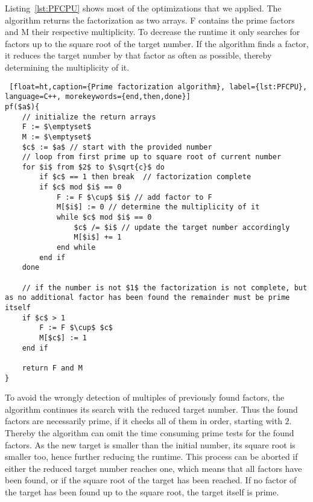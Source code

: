 Listing~\ref{lst:PFCPU} shows most of the optimizations that we applied. The algorithm returns the factorization as two arrays. F contains the prime factors and M their respective multiplicity. To decrease the runtime it only searches for factors up to the square root of the target number. If the algorithm finds a factor, it reduces the target number by that factor as often as possible, thereby determining the multiplicity of it.

\begin{lstlisting} [float=ht,caption={Prime factorization algorithm}, label={lst:PFCPU}, language=C++, morekeywords={end,then,done}]
pf($a$){
	// initialize the return arrays
	F := $\emptyset$
	M := $\emptyset$
	$c$ := $a$ // start with the provided number
	// loop from first prime up to square root of current number
	for $i$ from $2$ to $\sqrt{c}$ do
		if $c$ == 1 then break  // factorization complete
		if $c$ mod $i$ == 0
			F := F $\cup$ $i$ // add factor to F
			M[$i$] := 0 // determine the multiplicity of it
			while $c$ mod $i$ == 0
				$c$ /= $i$ // update the target number accordingly
				M[$i$] += 1
			end while
		end if
	done
	
	// if the number is not $1$ the factorization is not complete, but as no additional factor has been found the remainder must be prime itself
	if $c$ > 1
		F := F $\cup$ $c$
		M[$c$] := 1
	end if
	
	return F and M
}
\end{lstlisting} 

To avoid the wrongly detection of multiples of previously found factors, the algorithm continues its search with the reduced target number. Thus the found factors are necessarily prime, if it checks all of them in order, starting with $2$. Thereby the algorithm can omit the time consuming prime tests for the found factors. As the new target is smaller than the initial number, its square root is smaller too, hence further reducing the runtime. This process can be aborted if either the reduced target number reaches one, which means that all factors have been found, or if the square root of the target has been reached. If no factor of the target has been found up to the square root, the target itself is prime.

